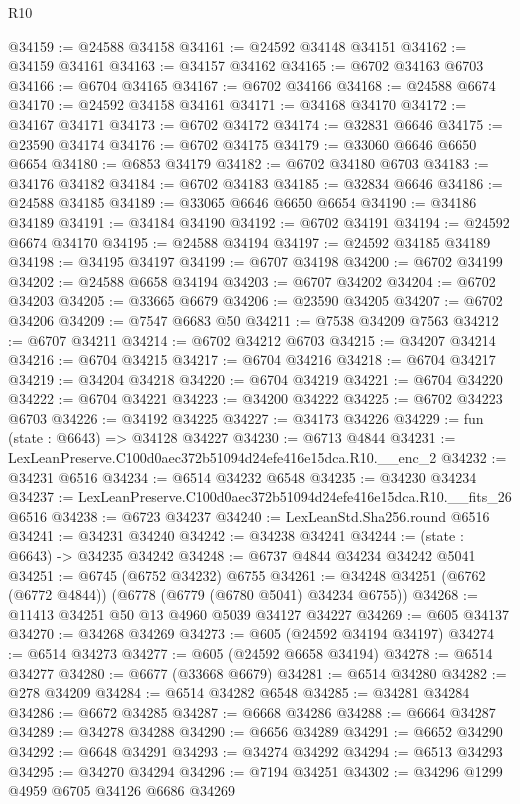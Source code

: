 \begin{lexlean}{R10}
\begin{coremodule}
@34159 := @24588 @34158
@34161 := @24592 @34148 @34151
@34162 := @34159 @34161
@34163 := @34157 @34162
@34165 := @6702 @34163 @6703
@34166 := @6704 @34165
@34167 := @6702 @34166
@34168 := @24588 @6674
@34170 := @24592 @34158 @34161
@34171 := @34168 @34170
@34172 := @34167 @34171
@34173 := @6702 @34172
@34174 := @32831 @6646
@34175 := @23590 @34174
@34176 := @6702 @34175
@34179 := @33060 @6646 @6650 @6654
@34180 := @6853 @34179
@34182 := @6702 @34180 @6703
@34183 := @34176 @34182
@34184 := @6702 @34183
@34185 := @32834 @6646
@34186 := @24588 @34185
@34189 := @33065 @6646 @6650 @6654
@34190 := @34186 @34189
@34191 := @34184 @34190
@34192 := @6702 @34191
@34194 := @24592 @6674 @34170
@34195 := @24588 @34194
@34197 := @24592 @34185 @34189
@34198 := @34195 @34197
@34199 := @6707 @34198
@34200 := @6702 @34199
@34202 := @24588 @6658 @34194
@34203 := @6707 @34202
@34204 := @6702 @34203
@34205 := @33665 @6679
@34206 := @23590 @34205
@34207 := @6702 @34206
@34209 := @7547 @6683 @50
@34211 := @7538 @34209 @7563
@34212 := @6707 @34211
@34214 := @6702 @34212 @6703
@34215 := @34207 @34214
@34216 := @6704 @34215
@34217 := @6704 @34216
@34218 := @6704 @34217
@34219 := @34204 @34218
@34220 := @6704 @34219
@34221 := @6704 @34220
@34222 := @6704 @34221
@34223 := @34200 @34222
@34225 := @6702 @34223 @6703
@34226 := @34192 @34225
@34227 := @34173 @34226
@34229 := fun (state : @6643) => @34128 @34227
@34230 := @6713 @4844
@34231 := LexLeanPreserve.C100d0aec372b51094d24efe416e15dca.R10.__enc_2
@34232 := @34231 @6516
@34234 := @6514 @34232 @6548
@34235 := @34230 @34234
@34237 := LexLeanPreserve.C100d0aec372b51094d24efe416e15dca.R10.__fits_26 @6516
@34238 := @6723 @34237
@34240 := LexLeanStd.Sha256.round @6516
@34241 := @34231 @34240
@34242 := @34238 @34241
@34244 := (state : @6643) -> @34235 @34242
@34248 := @6737 @4844 @34234 @34242 @5041
@34251 := @6745 (@6752 @34232) @6755
@34261 := @34248 @34251 (@6762 (@6772 @4844)) (@6778 (@6779 (@6780 @5041) @34234 @6755))
@34268 := @11413 @34251 @50 @13 @4960 @5039 @34127 @34227
@34269 := @605 @34137
@34270 := @34268 @34269
@34273 := @605 (@24592 @34194 @34197)
@34274 := @6514 @34273
@34277 := @605 (@24592 @6658 @34194)
@34278 := @6514 @34277
@34280 := @6677 (@33668 @6679)
@34281 := @6514 @34280
@34282 := @278 @34209
@34284 := @6514 @34282 @6548
@34285 := @34281 @34284
@34286 := @6672 @34285
@34287 := @6668 @34286
@34288 := @6664 @34287
@34289 := @34278 @34288
@34290 := @6656 @34289
@34291 := @6652 @34290
@34292 := @6648 @34291
@34293 := @34274 @34292
@34294 := @6513 @34293
@34295 := @34270 @34294
@34296 := @7194 @34251
@34302 := @34296 @1299 @4959 @6705 @34126 @6686 @34269

\end{coremodule}
\end{lexlean}
